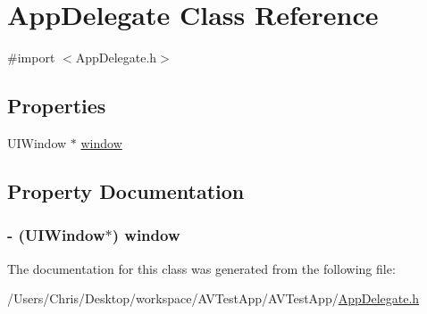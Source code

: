 \hypertarget{interface_app_delegate}{\section{\-App\-Delegate \-Class \-Reference}
\label{interface_app_delegate}
}


{\ttfamily \#import $<$\-App\-Delegate.\-h$>$}

\subsection*{\-Properties}
\begin{DoxyCompactItemize}
\item 
\-U\-I\-Window $\ast$ \hyperlink{interface_app_delegate_acf48ac24125e688cac1a85445cd7fac2}{window}
\end{DoxyCompactItemize}


\subsection{\-Property \-Documentation}
\hypertarget{interface_app_delegate_acf48ac24125e688cac1a85445cd7fac2}{
\subsubsection[{window}]{\setlength{\rightskip}{0pt plus 5cm}-\/ (\-U\-I\-Window$\ast$) {\bf window}}}\label{interface_app_delegate_acf48ac24125e688cac1a85445cd7fac2}


\-The documentation for this class was generated from the following file\-:\begin{DoxyCompactItemize}
\item 
/\-Users/\-Chris/\-Desktop/workspace/\-A\-V\-Test\-App/\-A\-V\-Test\-App/\hyperlink{_app_delegate_8h}{\-App\-Delegate.\-h}\end{DoxyCompactItemize}
